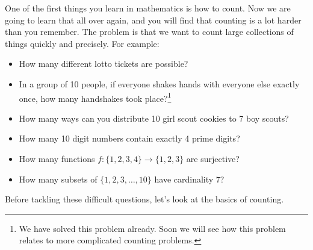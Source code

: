 \documentclass[12pt]{article}
\begin{document}
One of the first things you learn in mathematics is how to count.  Now we are going to learn that all over again, and you will find that counting is a lot harder than you remember.  The problem is that we want to count large collections of things quickly and precisely.  For example:
\begin{itemize}
 \item How many different lotto tickets are possible?
 \item In a group of 10 people, if everyone shakes hands with everyone else exactly once, how many handshakes took place?\footnote{We have solved this problem already.  Soon we will see how this problem relates to more complicated counting problems.}
 \item How many ways can you distribute 10 girl scout cookies to 7 boy scouts?
 \item How many 10 digit numbers contain exactly 4 prime digits?
 \item How many functions $f: \{1,2,3,4\} \to \{1,2,3\}$ are surjective?  
 \item How many subsets of $\{1,2,3,\ldots, 10\}$ have cardinality 7?
\end{itemize}

Before tackling these difficult questions, let's look at the basics of counting.
\end{document}
